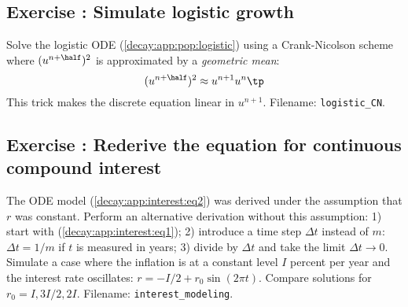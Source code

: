 \documentclass[graybox,sectrefs,envcountresetchap,open=right,final]{svmonodo}
\newenvironment{doconceexercise}{}{}
\newcounter{doconceexercisecounter}
\begin{document}
\begin{doconceexercise}

\subsection*{Exercise \thedoconceexercisecounter: Simulate logistic growth}

\label{decay:app:exer:pop:logistic1}

Solve the logistic ODE
(\ref{decay:app:pop:logistic}) using a Crank-Nicolson scheme where
$(u^{n+\half})^2$ is approximated by a \emph{geometric mean}:
\[ (u^{n+\half})^2 \approx u^{n+1}u^n
\tp
\]
This trick makes the discrete equation linear in $u^{n+1}$.
\noindent Filename: \Verb!logistic_CN!.

\end{doconceexercise}




\begin{doconceexercise}

\subsection*{Exercise \thedoconceexercisecounter: Rederive the equation for continuous compound interest}

\label{decay:app:exer:interest:derive}

The ODE model (\ref{decay:app:interest:eq2}) was derived under the assumption
that $r$ was constant. Perform an alternative derivation without
this assumption: 1) start with (\ref{decay:app:interest:eq1});
2) introduce a time step $\Delta t$ instead of $m$: $\Delta t = 1/m$ if
$t$ is measured in years; 3) divide by $\Delta t$ and take the
limit $\Delta t\rightarrow 0$. Simulate a case where the inflation is
at a constant level $I$ percent per year and the interest rate oscillates:
$r=-I/2 + r_0\sin(2\pi t)$.
Compare solutions for $r_0=I, 3I/2, 2I$.
\noindent Filename: \Verb!interest_modeling!.

\end{doconceexercise}
\end{document}
